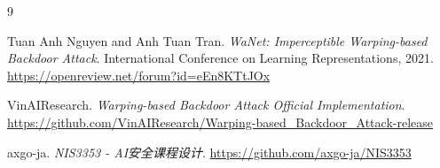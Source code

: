 \documentclass[UTF8,zihao=-4]{ctexart}
\begin{document}
\begin{thebibliography}{9}

Tuan Anh Nguyen and Anh Tuan Tran.
\newblock \textit{WaNet: Imperceptible Warping-based Backdoor Attack}.
\newblock International Conference on Learning Representations, 2021.
\newblock \url{https://openreview.net/forum?id=eEn8KTtJOx}

VinAIResearch.
\newblock \textit{Warping-based Backdoor Attack Official Implementation}.
\newblock \url{https://github.com/VinAIResearch/Warping-based_Backdoor_Attack-release}

axgo-ja.
\newblock \textit{NIS3353 - AI安全课程设计}.
\newblock \url{https://github.com/axgo-ja/NIS3353}

\end{thebibliography}
\end{document}
